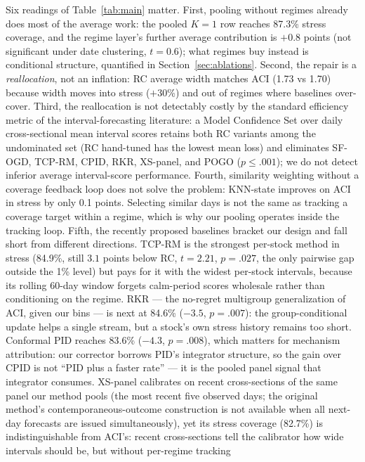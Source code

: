 Six readings of Table~\ref{tab:main} matter. First, pooling without
regimes already does most of the average work: the pooled $K = 1$ row
reaches 87.3\% stress coverage, and the regime layer's further average
contribution is $+0.8$ points (not significant under date clustering,
$t = 0.6$); what regimes buy instead is conditional structure,
quantified in Section~\ref{sec:ablations}. Second, the repair is a
\emph{reallocation}, not an inflation: RC average width matches ACI (1.73
vs 1.70) because width moves into stress ($+$30\%) and out of regimes
where baselines over-cover. Third, the reallocation is not detectably
costly by the standard efficiency metric of the interval-forecasting
literature: a Model Confidence Set \citep{hansen2011model}
over daily cross-sectional mean interval scores \citep{winkler1972decision}
retains both RC variants among the undominated set (RC hand-tuned has the
lowest mean loss) and eliminates SF-OGD, TCP-RM, CPID, RKR, XS-panel,
and POGO ($p \le .001$); we do not detect inferior average
interval-score performance. Fourth, similarity weighting
without a coverage feedback loop does not solve the problem: KNN-state
improves on ACI in stress by only 0.1 points. Selecting similar days is
not the same as tracking a coverage target within a regime, which is why our
pooling operates inside the tracking loop. Fifth, the recently proposed baselines bracket our design and fall
short from different directions. TCP-RM is the strongest per-stock
method in stress (84.9\%, still $3.1$ points below RC, $t = 2.21$,
$p = .027$, the only pairwise gap outside the 1\% level) but pays for
it with the widest per-stock intervals, because its rolling 60-day
window forgets calm-period scores wholesale rather than conditioning on
the regime. RKR --- the no-regret multigroup generalization of ACI,
given our bins --- is next at 84.6\% ($-3.5$, $p = .007$): the
group-conditional update helps a single stream, but a stock's own
stress history remains too short. Conformal PID reaches 83.6\%
($-4.3$, $p = .008$), which matters for mechanism attribution: our
corrector borrows PID's integrator structure, so the gain over CPID is
not ``PID plus a faster rate'' --- it is the pooled panel signal that
integrator consumes. XS-panel
calibrates on recent cross-sections of the same panel our method pools
(the most recent five observed days; the original method's
contemporaneous-outcome construction is not available when all next-day
forecasts are issued simultaneously), yet its stress coverage (82.7\%)
is indistinguishable from ACI's: recent cross-sections tell the
calibrator how wide intervals should be, but without per-regime tracking
